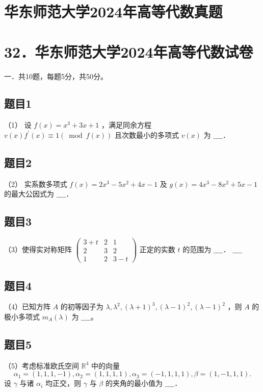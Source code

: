 \documentclass{article}
\begin{document}
\section*{华东师范大学2024年高等代数真题}
\section*{32．华东师范大学2024年高等代数试卷}

一．共10题，每题5分，共50分。

\subsection{题目1}
（1） 设 \(f(x)=x^{3}+3 x+1\) ，满足同余方程 \(v(x) f^{\prime}(x) \equiv 1(\bmod f(x))\) 且次数最小的多项式 \(v(x)\) 为
\(\_\_\_\_\)．

\subsection{题目2}
（2） 实系数多项式 \(f(x)=2 x^{3}-5 x^{2}+4 x-1\) 及 \(g(x)=4 x^{3}-8 x^{2}+5 x-1\) 的最大公因式为 \(\_\_\_\_\)．

\subsection{题目3}
（3）使得实对称矩阵 \(\left(\begin{array}{ccc}3+t & 2 & 1 \\ 2 & 3 & 2 \\ 1 & 2 & 3-t\end{array}\right)\) 正定的实数 \(t\) 的范围为 \(\_\_\_\_\)．
\(\_\_\_\_\)

\subsection{题目4}
（4）已知方阵 \(A\) 的初等因子为 \(\lambda, \lambda^{2},(\lambda+1)^{3},(\lambda-1)^{2},(\lambda-1)^{2}\) ，则 \(A\) 的极小多项式 \(m_{A}(\lambda)\) 为
\(\_\_\_\_\)。

\subsection{题目5}
（5）考虑标准欧氏空间 \(\mathbb{R}^{4}\) 中的向量
\[
\alpha_{1}=(1,1,1,-1), \alpha_{2}=(1,1,1,1), \alpha_{3}=(-1,1,1,1), \beta=(1,-1,1,1) .
\]
设 \(\gamma\) 与诸 \(\alpha_{i}\) 均正交，则 \(\gamma\) 与 \(\beta\) 的夹角的最小值为 \(\_\_\_\_\)．
\end{document}

